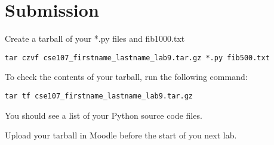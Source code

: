 \documentclass[12pt]{article}
\begin{document}





\section*{Submission}

Create a tarball of your *.py files and fib1000.txt

\begin{lstlisting}[style=bash]
tar czvf cse107_firstname_lastname_lab9.tar.gz *.py fib500.txt
\end{lstlisting}


To check the contents of your tarball, run the following command:

\begin{lstlisting}[style=bash]
tar tf cse107_firstname_lastname_lab9.tar.gz
\end{lstlisting}

You should see a list of your Python source code files.

Upload your tarball in Moodle before the start of you next lab.
\end{document}
